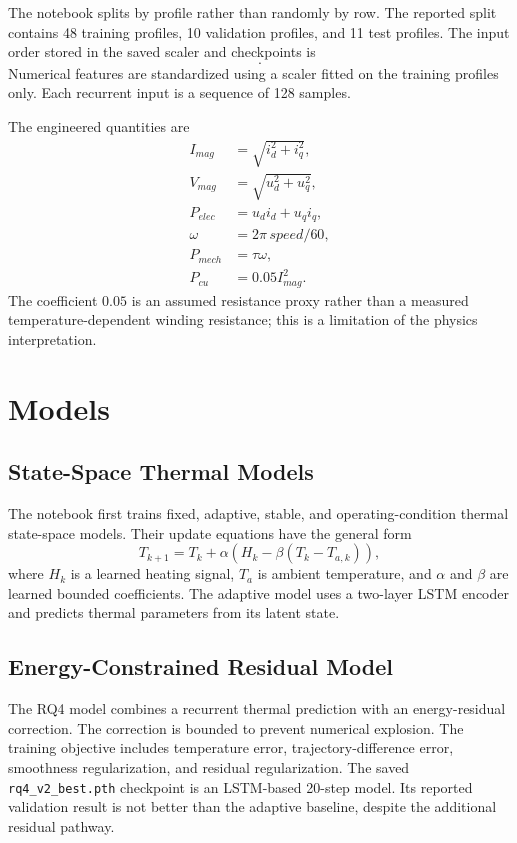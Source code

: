 \documentclass[conference]{IEEEtran}
\begin{document}
The notebook splits by profile rather than randomly by row. The reported split
contains 48 training profiles, 10 validation profiles, and 11 test profiles.
The input order stored in the saved scaler and checkpoints is
\begin{equation}
 [u_q,\;coolant,\;u_d,\;speed,\;i_d,\;i_q,\;\tau,\;ambient,
 I_{mag},V_{mag},P_{elec},P_{mech},P_{cu}].
\end{equation}
Numerical features are standardized using a scaler fitted on the training
profiles only. Each recurrent input is a sequence of 128 samples.

The engineered quantities are
\begin{align}
 I_{mag} &= \sqrt{i_d^2+i_q^2},\\
 V_{mag} &= \sqrt{u_d^2+u_q^2},\\
 P_{elec} &= u_di_d+u_qi_q,\\
 \omega &= 2\pi\,speed/60,\\
 P_{mech} &= \tau\omega,\\
 P_{cu} &= 0.05I_{mag}^2.
\end{align}
The coefficient $0.05$ is an assumed resistance proxy rather than a measured
temperature-dependent winding resistance; this is a limitation of the
physics interpretation.

\section{Models}
\subsection{State-Space Thermal Models}
The notebook first trains fixed, adaptive, stable, and operating-condition
thermal state-space models. Their update equations have the general form
\begin{equation}
 T_{k+1}=T_k+\alpha\left(H_k-\beta(T_k-T_{a,k})\right),
\end{equation}
where $H_k$ is a learned heating signal, $T_a$ is ambient temperature, and
$\alpha$ and $\beta$ are learned bounded coefficients. The adaptive model
uses a two-layer LSTM encoder and predicts thermal parameters from its latent
state.

\subsection{Energy-Constrained Residual Model}
The RQ4 model combines a recurrent thermal prediction with an energy-residual
correction. The correction is bounded to prevent numerical explosion. The
training objective includes temperature error, trajectory-difference error,
smoothness regularization, and residual regularization. The saved
\texttt{rq4\_v2\_best.pth} checkpoint is an LSTM-based 20-step model. Its
reported validation result is not better than the adaptive baseline, despite
the additional residual pathway.
\end{document}
